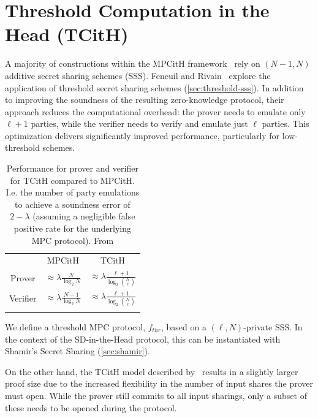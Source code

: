 \documentclass[11pt]{report}
\theoremstyle{definition}
\theoremstyle{plain}
\begin{document}
\section{Threshold Computation in the Head (TCitH)}\label{sec:threshold-mpc}

A majority of constructions within the MPCitH framework~\cite{baum2020concretely,feneuil2022syndrome,katz2018improved} rely on $ (N-1, N) $ additive secret sharing schemes (SSS). Feneuil and Rivain~\cite{feneuil2023threshold,feneuil2023threshold2} explore the application of threshold secret sharing schemes (\autoref{sec:threshold-sss}). In addition to improving the soundness of the resulting zero-knowledge protocol, their approach reduces the computational overhead: the prover needs to emulate only $ \ell + 1 $ parties, while the verifier needs to verify and emulate just $ \ell $ parties. This optimization delivers significantly improved performance, particularly for low-threshold schemes.

\begin{table}[]
  \centering
  \def\arraystretch{1.5}%
  \begin{tabular}{cc|c}
    \textbf{} & MPCitH                                  & TCitH                                                      \\ \arrayrulecolor{darkgray}\hline
    Prover    & $ \approx \lambda \frac{N}{\log_2 N}$   & $ \approx \lambda \frac{\ell + 1}{\log_2 \binom{N}{\ell}}$ \\ \arrayrulecolor{lightgray}\hline
    Verifier  & $ \approx \lambda \frac{N-1}{\log_2 N}$ & $ \approx \lambda \frac{\ell + 1}{\log_2 \binom{N}{\ell}}$ \\ \arrayrulecolor{darkgray}\hline
  \end{tabular}
  \caption{Performance for prover and verifier for TCitH compared to MPCitH. I.e. the number of party emulations to achieve a soundness error of $2-\lambda$ (assuming a negligible false positive rate for the underlying MPC protocol). From \cite{feneuil2023threshold}}\label{tbl:tcith-performance}
\end{table}

We define a threshold MPC protocol, $ f_{thr} $, based on a $ (\ell, N) $-private SSS. In the context of the SD-in-the-Head protocol, this can be instantiated with Shamir's Secret Sharing (\autoref{sec:shamir}).

On the other hand, the TCitH model described by~\cite{feneuil2023threshold} results in a slightly larger proof size due to the increased flexibility in the number of input shares the prover must open. While the prover still commits to all input sharings, only a subset of these needs to be opened during the protocol.
\end{document}
